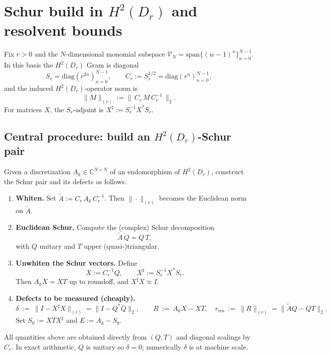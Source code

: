 \documentclass[11pt]{article}
\begin{document}
\section{Schur build in \texorpdfstring{$H^2(D_r)$}{H2(Dr)} and resolvent bounds}
\label{sec:schur-centered}

Fix \(r>0\) and the \(N\)-dimensional monomial subspace
\(\mathcal V_N=\mathrm{span}\{(w-1)^n\}_{n=0}^{N-1}\).
In this basis the \(H^2(D_r)\) Gram is diagonal
\[
S_r=\mathrm{diag}(r^{2n})_{n=0}^{N-1},\qquad C_r:=S_r^{1/2}=\mathrm{diag}(r^{n})_{n=0}^{N-1},
\]
and the induced \(H^2(D_r)\)-operator norm is
\[
\|M\|_{(r)}:=\|\,C_r\,M\,C_r^{-1}\,\|_2.
\]
For matrices \(X\), the \(S_r\)-adjoint is \(X^\sharp:=S_r^{-1}X^\ast S_r\).

\subsection*{Central procedure: build an \(H^2(D_r)\)-Schur pair}
Given a discretization \(A_k\in\mathbb C^{N\times N}\) of an endomorphism of \(H^2(D_r)\),
construct the Schur pair and its defects as follows.

\begin{enumerate}
\item \textbf{Whiten.} Set \(\widetilde A:=C_r\,A_k\,C_r^{-1}\).
Then \(\|\cdot\|_{(r)}\) becomes the Euclidean norm on \(\widetilde A\).

\item \textbf{Euclidean Schur.} Compute the (complex) Schur decomposition
\[
\widetilde A\,Q=Q\,T,
\]
with \(Q\) unitary and \(T\) upper (quasi-)triangular.

\item \textbf{Unwhiten the Schur vectors.} Define
\[
X:=C_r^{-1}Q,\qquad X^\sharp:=S_r^{-1}X^\ast S_r.
\]
Then \(A_k X = X T\) up to roundoff, and \(X^\sharp X \approx I\).

\item \textbf{Defects to be measured (cheaply).}
\[
\delta\ :=\ \|I-X^\sharp X\|_{(r)}=\|I-Q^\ast Q\|_2,\qquad
R\ :=\ A_kX-XT,\quad r_{\mathrm{res}}\ :=\ \|R\|_{(r)}=\|\widetilde A Q-QT\|_2.
\]
Set \(S_0:=XTX^\sharp\) and \(E:=A_k-S_0\).
\end{enumerate}

\medskip
All quantities above are obtained directly from \((Q,T)\) and diagonal scalings by \(C_r\).
In exact arithmetic, \(Q\) is unitary so \(\delta=0\); numerically \(\delta\) is at machine scale.
\end{document}
